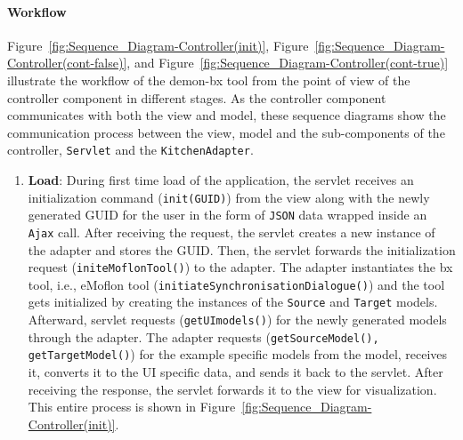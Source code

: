 \paragraph{Workflow}
Figure~\ref{fig:Sequence_Diagram-Controller(init)}, 
Figure~\ref{fig:Sequence_Diagram-Controller(cont-false)},
and Figure~\ref{fig:Sequence_Diagram-Controller(cont-true)} illustrate the workflow of the demon-bx tool from the point of view of the controller component in different stages. As the controller component communicates with both the view and model, these sequence diagrams show the communication process between the view, model and the sub-components of the controller, \texttt{Servlet} and the \texttt{KitchenAdapter}.

\begin{enumerate}
	\item {\textbf{Load}: During first time load of the application, the servlet receives an initialization command (\texttt{init(GUID)}) from the view along with the newly generated GUID for the user in the form of \texttt{JSON} data wrapped inside an \texttt{Ajax} call. After receiving the request, the servlet creates a new instance of the adapter and stores the GUID. Then, the servlet forwards the initialization request (\texttt{initeMoflonTool()}) to the adapter. The adapter instantiates the bx tool, i.e., eMoflon tool (\texttt{initiateSynchronisationDialogue()}) and the tool gets initialized by creating the instances of the \texttt{Source} and \texttt{Target} models. Afterward, servlet requests 
	(\texttt{getUImodels()}) for the newly generated models through the adapter. The adapter requests (\texttt{getSourceModel(), getTargetModel()}) for the example specific models from the model, receives it, converts it to the UI specific data, and sends it back to the servlet. After receiving the response, the servlet forwards it to the view for visualization. This entire process is shown in Figure~\ref{fig:Sequence_Diagram-Controller(init)}.}
		

\end{enumerate}
